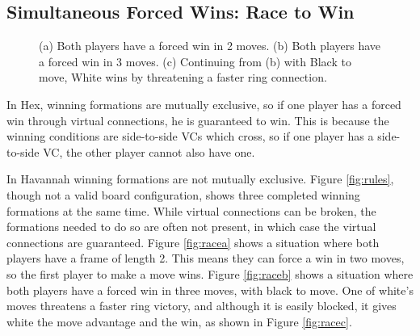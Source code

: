 \subsection{Simultaneous Forced Wins: Race to Win}

\begin{figure}
	\centering
	\caption[Simultaneous Forced Wins: Race to Win]{(a) Both players have a forced win in 2 moves. (b) Both players have a forced win in 3 moves. (c) Continuing from (b) with Black to move, White wins
by threatening a faster ring connection.}
	\label{fig:race}
\end{figure}


In Hex, winning formations are mutually exclusive, so if one player has a forced win through virtual connections, he is guaranteed to win. This is because the winning conditions are side-to-side VCs which cross, so if one player has a side-to-side VC, the other player cannot also have one.

In Havannah winning formations are not mutually exclusive. Figure \ref{fig:rules}, though not a valid board configuration, shows three completed winning formations at the same time. While virtual connections can be broken, the formations needed to do so are often not present, in which case the virtual connections are guaranteed. Figure \ref{fig:racea} shows a situation where both players have a frame of length 2. This means they can force a win in two moves, so the first player to make a move wins. Figure \ref{fig:raceb} shows a situation where both players have a forced win in three moves, with black to move. One of white's moves threatens a faster ring victory, and although it is easily blocked, it gives white the move advantage and the win, as shown in Figure \ref{fig:racec}.



